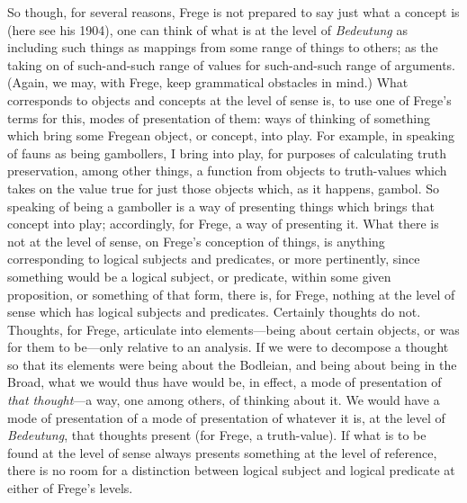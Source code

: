So though, for several reasons, Frege is not prepared to say just what a concept is (here see his 1904), one can think of what is at the level of \emph{Bedeutung} as including such things as mappings from some range of things to others; as the taking on of such-and-such range of values for such-and-such range of arguments. (Again, we may, with Frege, keep grammatical obstacles in mind.) What corresponds to objects and concepts at the level of sense is, to use one of Frege's terms for this, modes of presentation of them: ways of thinking of something which bring some Fregean object, or concept, into play. For example, in speaking of fauns as being gambollers, I bring into play, for purposes of calculating truth preservation, among other things, a function from objects to truth-values which takes on the value true for just those objects which, as it happens, gambol. So speaking of being a gamboller is a way of presenting things which brings that concept into play; accordingly, for Frege, a way of presenting it. What there is not at the level of sense, on Frege’s conception of things, is anything corresponding to logical subjects and predicates, or more pertinently, since something would be a logical subject, or predicate, within some given proposition, or something of that form, there is, for Frege, nothing at the level of sense which has logical subjects and predicates. Certainly thoughts do not. Thoughts, for Frege, articulate into elements---being about certain objects, or was for them to be---only relative to an analysis. If we were to decompose a thought so that its elements were being about the Bodleian, and being about being in the Broad, what we would thus have would be, in effect, a mode of presentation of \emph{that thought}---a way, one among others, of thinking about it. We would have a mode of presentation of a mode of presentation of whatever it is, at the level of \emph{Bedeutung}, that thoughts present (for Frege, a truth-value). If what is to be found at the level of sense always presents something at the level of reference, there is no room for a distinction between logical subject and logical predicate at either of Frege’s levels.

